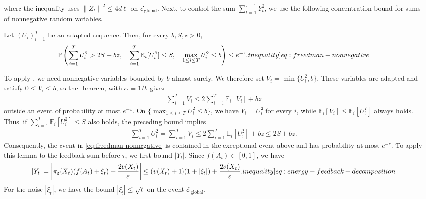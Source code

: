 \documentclass[12pt,cleveref]{jmlr}
\renewenvironment{proof}[1][\proofname]
{\par\noindent{\bfseries\upshape #1\ }}
{\jmlrQED}
\newcommand{\ineqlabel}[1]{\label[inequality]{#1}}
\newcommand{\E}{\mathbb E}
\newcommand{\Pp}{\mathbb P}
\newcommand{\1}{\mathbf 1}
\newcommand{\eps}{\varepsilon}
\newcommand{\norm}[1]{\left\lVert #1\right\rVert}
\newcommand{\alireza}[1]{\todo[color=blue!20,size=\tiny]{Alireza: #1}}
\begin{document}
where the inequality uses $\norm{Z_t}^2\leq 4d\ell$ on $\mathcal E_{\mathrm{global}}$.
Next, to control the sum $\sum_{t=1}^{\tau-1}Y_t^2$, we use the following
concentration bound for sums of nonnegative random variables.
\begin{lemma}
    \label{lem:freedman-nonnegative}
    Let $(U_i)_{i=1}^T$ be an adapted sequence.
    Then, for every $b,S,z>0$,\alireza{checked.}
    \begin{align}
        \Pp\left(
            \sum_{i=1}^T U_i^2
            > 2S+bz,
            \quad
            \sum_{i=1}^T\E_i[U_i^2]\leq S,
            \quad
            \max_{1\leq i\leq T}U_i^2\leq b
        \right)
        \leq e^{-z}.
        \ineqlabel{eq:freedman-nonnegative}
    \end{align}
\end{lemma}
\begin{proof}
    To apply \citet[Theorem~B.22]{lattimore2026bandit}, we need nonnegative
    variables bounded by $b$ almost surely. We therefore set
    $V_i=\min\{U_i^2,b\}$. These variables are adapted and satisfy
    $0\leq V_i\leq b$, so the theorem, with $\alpha=1/b$ gives
    \begin{align}
        \sum_{i=1}^T V_i
        \leq 2\sum_{i=1}^T\E_i[V_i]+bz
    \end{align}
    outside an event of probability at most $e^{-z}$.
    On $\{\max_{1\leq i\leq T}U_i^2\leq b\}$, we have $V_i=U_i^2$ for
    every $i$, while $\E_i[V_i]\leq\E_i[U_i^2]$ always holds.
    Thus, if $\sum_{i=1}^T\E_i[U_i^2]\leq S$ also holds, the preceding
    bound implies
    \begin{align}
        \sum_{i=1}^T U_i^2
        =\sum_{i=1}^T V_i
        \leq 2\sum_{i=1}^T\E_i[U_i^2]+bz
        \leq 2S+bz.
    \end{align}
    Consequently, the event in \cref{eq:freedman-nonnegative} is contained
    in the exceptional event above and has probability at most $e^{-z}$.
\end{proof}
To apply this lemma to the feedback sum before $\tau$, we first bound $|Y_t|$.
Since $f(A_t)\in[0,1]$, we have
\begin{align}
    |Y_t|=\left|\pi_\eps(X_t)(f(A_t)+\xi_t)+\frac{2v(X_t)}{\eps}\right|
    \leq
    (v(X_t) + 1)(1+|\xi_t|)+\frac{2v(X_t)}{\eps}.
    \ineqlabel{eq:energy-feedback-decomposition}
\end{align}
For the noise $|\xi_t|$, we have the bound $|\xi_t|\leq\sqrt\ell$ on the event $\mathcal E_{\mathrm{global}}$.
\end{document}
